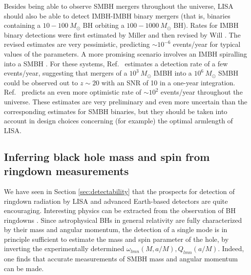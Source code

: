 \documentclass[]{iopart}
\begin{document}
Besides being able to observe SMBH mergers throughout the universe, LISA
should also be able to detect IMBH-IMBH binary mergers (that is, binaries
containing a $10-100~M_\odot$ BH orbiting a $100-1000~M_\odot$ BH). Rates for
IMBH binary detections were first estimated by Miller \cite{Miller:2002vg} and
then revised by Will \cite{Will:2004fj}. The revised estimates are very
pessimistic, predicting $\sim 10^{-6}$ events/year for typical values of the
parameters. A more promising scenario involves 
an IMBH spiralling into a SMBH \cite{Matsubayashi:2004bd}. For these
systems, Ref.~\cite{Miller:2004va} estimates a detection rate of a few
events/year, suggesting that mergers of a $10^3~M_\odot$ IMBH into a
$10^6~M_\odot$ SMBH could be observed out to $z\sim 20$ with an SNR of 10 in a
one-year integration. Ref.~\cite{PortegiesZwart:2005zp} predicts an even more
optimistic rate of $\sim 10^2$ events/year throughout the universe. These
estimates are very preliminary and even more uncertain than the corresponding
estimates for SMBH binaries, but they should be taken into account in design
choices concerning (for example) the optimal armlength of LISA.

\subsection{\label{sec:inferringmassrd}Inferring black hole mass and spin from ringdown measurements}

We have seen in Section \ref{sec:detectability} that the prospects for
detection of ringdown radiation by LISA and advanced Earth-based detectors are
quite encouraging.  Interesting physics can be extracted from the observation
of BH ringdowns \cite{Berti:2005ys,Finn:1992wt,Dreyer:2003bv}.  Since
astrophysical BHs in general relativity are fully characterized by their mass
and angular momentum, the detection of a single mode is in principle
sufficient to estimate the mass and spin parameter of the hole, by inverting
the experimentally determined $\omega_{lmn}(M,a/M), Q_{lmn}(a/M)$.  Indeed,
one finds that accurate measurements of SMBH mass and angular momentum can be
made.
\end{document}
